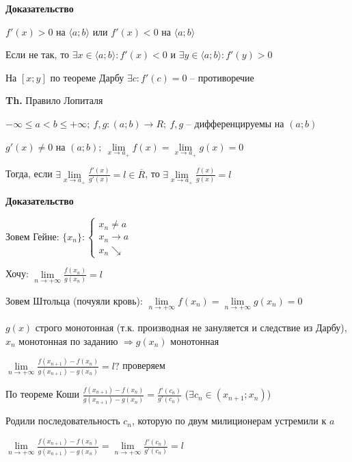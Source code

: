 \documentclass[14pt, letter paper]{article}
\newcommand{\q}[1]{\langle #1 \rangle}
\begin{document}
\begin{center}
    \textbf{Доказательство}
\end{center}

$f'(x) > 0$ на $\q{a; b}$ или $f'(x) < 0$ на $\q{a; b}$

Если не так, то $\exists x \in \q{a; b} : f'(x) < 0$ и $\exists y \in \q{a; b} : f'(y) > 0$

На $[x; y]$ по теореме Дарбу $\exists c : f'(c) = 0$ -- противоречие

\vspace{5mm}

\textbf{Th.} Правило Лопиталя

$- \infty \leq a < b \leq + \infty;\ f, g : (a; b) \rightarrow R;\ f, g$ -- дифференцируемы на $(a; b)$ 

$g'(x) \neq 0$ на $(a; b);\ \lim\limits_{x \rightarrow a_+} f(x) = \lim\limits_{x \rightarrow a_+} g(x) = 0$

Тогда, если $\exists \lim\limits_{x \rightarrow a_+} \frac{f'(x)}{g'(x)} = l \in \overline{R}$, то $\exists \lim\limits_{x \rightarrow a_+} \frac{f(x)}{g(x)} = l$

\begin{center}
    \textbf{Доказательство}
\end{center}

Зовем Гейне: $\{x_n\} : \begin{cases}
    x_n \neq a \\
    x_n \rightarrow a \\
    x_n \searrow
\end{cases}$

Хочу: $\lim\limits_{n \rightarrow +\infty} \frac{f(x_n)}{g(x_n)} = l$

Зовем Штольца (почуяли кровь): $\lim\limits_{n \rightarrow +\infty} f(x_n) = \lim\limits_{n \rightarrow +\infty} g(x_n) = 0$

$g(x)$ строго монотонная (т.к. производная не зануляется и следствие из Дарбу), $x_n$ монотонная по заданию $\Rightarrow g(x_n)$ монотонная

$\lim\limits_{n \rightarrow +\infty} \frac{f(x_{n + 1}) - f(x_n)}{g(x_{n + 1}) - g(x_n)} = l?$ проверяем

По теореме Коши $\frac{f(x_{n + 1}) - f(x_n)}{g(x_{n + 1}) - g(x_n)} = \frac{f'(c_n)}{g'(c_n)}$ ($\exists c_n \in (x_{n + 1}; x_n)$)

Родили последовательность $c_n$, которую по двум милиционерам устремили к $a$

$\lim\limits_{n \rightarrow +\infty} \frac{f(x_{n + 1}) - f(x_n)}{g(x_{n + 1}) - g(x_n)} = \lim\limits_{n \rightarrow +\infty} \frac{f'(c_n)}{g'(c_n)} = l$
\end{document}
